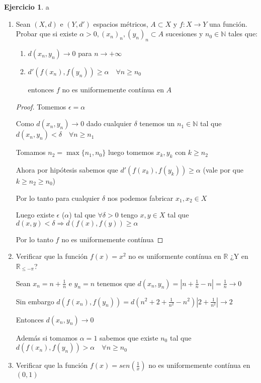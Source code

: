 \documentclass[11pt]{report}
\newcommand{\R}{\mathbb{R}}
\newcommand{\N}{\mathbb{N}}
\newcommand{\Ra}{\Rightarrow}
\newcommand{\ra}{\rightarrow}
\theoremstyle{definition}
\newtheorem{ej}{Ejercicio}
\begin{document}
	\begin{ej}a
		\begin{enumerate}
			\item Sean $(X,d)$ e $(Y,d')$ espacios métricos, $A \subset X$ y $f: X \ra Y$ una función. Probar que si existe $\alpha > 0, (x_n)_n, (y_n)_n \subset A$ sucesiones y $n_0 \in \N$ tales que:
				\begin{enumerate}
					\item $d(x_n,y_n) \ra 0$ para $n \ra +\infty$						
						
					\item $d'(f(x_n),f(y_n)) \geq \alpha \quad \forall n \geq n_0$

					entonces $f$ no es uniformemente contínua en $A$
				\end{enumerate}
				\begin{proof}
					Tomemos $\epsilon = \alpha$

					Como $d(x_n,y_n) \ra 0$ dado cualquier $\delta$ tenemos un $n_1 \in \N$ tal que $d(x_n,y_n) < \delta \quad \forall n \geq n_1$

					Tomamos $n_2 = \max\{n_1,n_0\}$ luego tomemos $x_{k},y_{k}$ con $k \geq n_2$

					Ahora por hipótesis sabemos que $d'(f(x_{k}),f(y_{k})) \geq \alpha$ (vale por que $k \geq n_2 \geq n_0$)

					Por lo tanto para cualquier $\delta$ nos podemos fabricar $x_1,x_2 \in X$

					Luego existe $\epsilon $ ($\alpha$) tal que $\forall \delta >0 $ tengo  $x,y \in X$ tal que $d(x,y)<\delta \Ra d(f(x),f(y)) \geq \alpha$

					Por lo tanto $f$ no es uniformemente contínua
				\end{proof}
				
				
			\item Verificar que la función $f(x)=x^2$ no es uniformente contínua en $\R$ ¿Y en $\R_{\leq -\pi}$?

				Sean $x_n = n + \frac{1}{n}$ e $y_n = n$ tenemos que $d(x_n,y_n) = |n + \frac{1}{n} -n| = \frac{1}{n}  \ra 0$

				Sin embargo $d(f(x_n),f(y_n)) = d(n^2 + 2 + \frac{1}{n^2} - n^2) |2 + \frac{1}{n^2}| \ra 2 $

				Entonces $d(x_n,y_n) \ra 0$ 

				Además si tomamos $\alpha = 1$ sabemos que existe $n_0$ tal que $d(f(x_n),f(y_n)) > \alpha \quad \forall n \geq n_0$
			\item Verificar que la función $f(x) = sen(\frac{1}{x})$ no es uniformemente contínua en $(0,1)$
		\end{enumerate}
	
	\end{ej}
	
\end{document}
